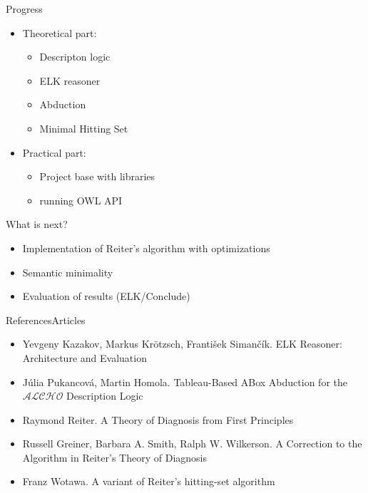 \documentclass{beamer}
\begin{document}
\begin{frame}{Progress}
	\begin{itemize}
		\item {
			Theoretical part: 
			\begin{itemize}
				\item Descripton logic
				\item ELK reasoner
				\item Abduction							
				\item Minimal Hitting Set
			\end{itemize}	
		}
	\end{itemize}		

	\begin{itemize}
		\item {
			Practical part: 
			\begin{itemize}
				\item Project base with libraries
				\item running OWL API
			\end{itemize}
		}
	\end{itemize}
\end{frame}

\begin{frame}{What is next?}
	\begin{itemize}
		
		\item {
			Implementation of Reiter's algorithm with optimizations
		}

		\item {
			Semantic minimality
		}
				
		\item {
			Evaluation of results (ELK/Conclude)
		}
		
	\end{itemize}
\end{frame}


\begin{frame}{References}{Articles}
	\begin{itemize}
	\item {
		Yevgeny Kazakov, Markus Krötzsch, František Simančík. ELK Reasoner: Architecture and Evaluation
	}
	
	\item {
		Júlia Pukancová, Martin Homola. Tableau-Based ABox Abduction for the 		$\mathcal{ALCHO}$ Description Logic
	}
	
	\item {
		Raymond Reiter. A Theory of Diagnosis from First Principles
	}
	
	\item {
		Russell Greiner, Barbara A. Smith, Ralph W. Wilkerson. A Correction to the Algorithm in Reiter's Theory of Diagnosis
	}

	\item {
		Franz Wotawa. A variant of Reiter’s hitting-set algorithm
	}
	\end{itemize}
\end{frame}
\end{document}
